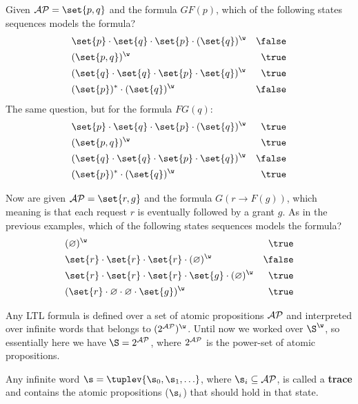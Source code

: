 \documentclass[oneside]{academica}
\begin{document}
\begin{example*}
  Given $\AP = \set{p,q}$ and the formula $GF(p)$, which of the following states sequences models the formula?
  \begin{align*}
    &\set{p} \cdot \set{q} \cdot \set{p} \cdot (\set{q})^\w  &\false \\
    &(\set{p,q})^\w &\true \\
    &(\set{q} \cdot \set{q} \cdot \set{p} \cdot \set{q})^\w &\true \\
    &(\set{p})^* \cdot (\set{q})^\w &\false
  \end{align*}
  The same question, but for the formula $FG(q)$:
  \begin{align*}
    &\set{p} \cdot \set{q} \cdot \set{p} \cdot (\set{q})^\w &\true \\
    &(\set{p,q})^\w &\true \\
    &(\set{q} \cdot \set{q} \cdot \set{p} \cdot \set{q})^\w &\false \\
    &(\set{p})^* \cdot (\set{q})^\w &\true
  \end{align*}

  \bigskip
  Now are given $\AP = \set{r,g}$ and the formula $G(r \to F(g))$, which meaning is that each request $r$ is eventually followed by a grant $g$.
  As in the previous examples, which of the following states sequences models the formula?
  \begin{align*}
    &(\emptyset)^\w &\true \\
    &\set{r} \cdot \set{r} \cdot \set{r} \cdot (\emptyset)^\w &\false \\
    &\set{r} \cdot \set{r} \cdot \set{r} \cdot \set{g} \cdot (\emptyset)^\w &\true \\
    &(\set{r} \cdot \emptyset \cdot \emptyset \cdot \set{g})^\w &\true
  \end{align*}
\end{example*}

Any LTL formula is defined over a set of atomic propositions ${\mathcal{AP}}$ and interpreted over infinite words that belongs to $(2^{\AP})^\w$.
Until now we worked over $\S^\w$, so essentially here we have $\S=2^{\AP}$, where $2^{{\mathcal{AP}}}$ is the power-set of atomic propositions.

Any infinite word $\s = \tuplev{\s_0, \s_1, \ldots}$, where $\s_i \subseteq \AP$, is called a \textbf{trace} and contains the atomic propositions ($\s_i$) that should hold in that state.
\end{document}
